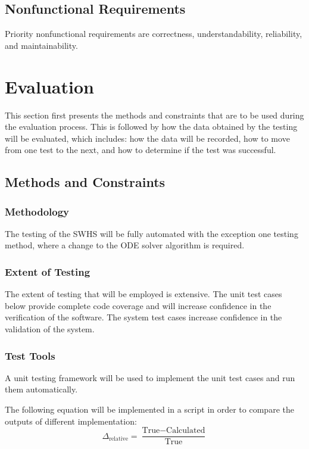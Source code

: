 \documentclass[12pt]{article}
\begin{document}
\subsection{Nonfunctional Requirements}
Priority nonfunctional requirements are correctness, understandability,
reliability, and maintainability.


%
%

\section{Evaluation}
This section first presents the methods and constraints that are to be used
during the evaluation process. This is followed by how the data obtained by the
testing will be evaluated, which includes: how the data will be recorded, how to
move from one test to the next, and how to determine if the test was successful.

\subsection{ Methods and Constraints} 

\subsubsection{Methodology} 
The testing of the SWHS will be fully automated with the exception one testing
method, where a change to the ODE solver algorithm is required.

\subsubsection{Extent of Testing}
The extent of testing that will be employed is extensive. The unit test cases
below provide complete code coverage and will increase confidence in the
verification of the software. The system test cases increase confidence in the
validation of the system.

\subsubsection{Test Tools}
A unit testing framework will be used to implement the unit test cases and run
them automatically.

The following equation will be implemented in a script in order to compare the
outputs of different implementation:
$$\Delta_{\text{relative}} = \frac{\text{True} - \text{Calculated}}
 {\text{True}} $$
\end{document}
